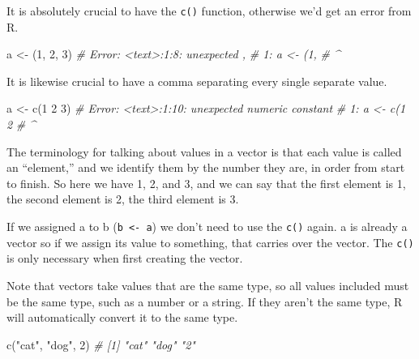 \documentclass[
  a4paper,
]{krantz}
\makeatletter
\newenvironment{Shaded}{\begin{snugshade}}{\end{snugshade}}
\newcommand{\CommentTok}[1]{\textcolor[rgb]{0.56,0.35,0.01}{\textit{#1}}}
\newcommand{\DecValTok}[1]{\textcolor[rgb]{0.00,0.00,0.81}{#1}}
\newcommand{\FunctionTok}[1]{\textcolor[rgb]{0.00,0.00,0.00}{#1}}
\newcommand{\NormalTok}[1]{#1}
\newcommand{\OtherTok}[1]{\textcolor[rgb]{0.56,0.35,0.01}{#1}}
\newcommand{\StringTok}[1]{\textcolor[rgb]{0.31,0.60,0.02}{#1}}
\newenvironment{kframe}{%
\medskip{}
\setlength{\fboxsep}{.8em}
 \def\at@end@of@kframe{}%
 \ifinner\ifhmode%
  \def\at@end@of@kframe{\end{minipage}}%
  \begin{minipage}{\columnwidth}%
 \fi\fi%
 \def\FrameCommand##1{\hskip\@totalleftmargin \hskip-\fboxsep
 \colorbox{shadecolor}{##1}\hskip-\fboxsep
     \hskip-\linewidth \hskip-\@totalleftmargin \hskip\columnwidth}%
 \MakeFramed {\advance\hsize-\width
   \@totalleftmargin\z@ \linewidth\hsize
   \@setminipage}}%
 {\par\unskip\endMakeFramed%
 \at@end@of@kframe}
\renewenvironment{Shaded}{\begin{kframe}}{\end{kframe}}
\makeatother
\begin{document}
It is absolutely crucial to have the \texttt{c()} function,
otherwise we'd get an error from R.

\begin{Shaded}
\begin{Highlighting}[]
\NormalTok{a }\OtherTok{\textless{}{-}}\NormalTok{ (}\DecValTok{1}\NormalTok{, }\DecValTok{2}\NormalTok{, }\DecValTok{3}\NormalTok{)}
\CommentTok{\# Error: \textless{}text\textgreater{}:1:8: unexpected \textquotesingle{},\textquotesingle{}}
\CommentTok{\# 1: a \textless{}{-} (1,}
\CommentTok{\#            \^{}}
\end{Highlighting}
\end{Shaded}

It is likewise crucial to have a comma separating every
single separate value.

\begin{Shaded}
\begin{Highlighting}[]
\NormalTok{a }\OtherTok{\textless{}{-}} \FunctionTok{c}\NormalTok{(}\DecValTok{1} \DecValTok{2} \DecValTok{3}\NormalTok{)}
\CommentTok{\# Error: \textless{}text\textgreater{}:1:10: unexpected numeric constant}
\CommentTok{\# 1: a \textless{}{-} c(1 2}
\CommentTok{\#              \^{}}
\end{Highlighting}
\end{Shaded}

The terminology for talking about values in a vector is that
each value is called an ``element,'' and we identify them by
the number they are, in order from start to finish. So here
we have 1, 2, and 3, and we can say that the first element
is 1, the second element is 2, the third element is 3.

If we assigned a to b (\texttt{b\ \textless{}-\ a}) we don't
need to use the \texttt{c()} again. a is already a vector so
if we assign its value to something, that carries over the
vector. The \texttt{c()} is only necessary when first
creating the vector.

Note that vectors take values that are the same type, so all
values included must be the same type, such as a number or a
string. If they aren't the same type, R will automatically
convert it to the same type.

\begin{Shaded}
\begin{Highlighting}[]
\FunctionTok{c}\NormalTok{(}\StringTok{"cat"}\NormalTok{, }\StringTok{"dog"}\NormalTok{, }\DecValTok{2}\NormalTok{)}
\CommentTok{\# [1] "cat" "dog" "2"}
\end{Highlighting}
\end{Shaded}
\end{document}
